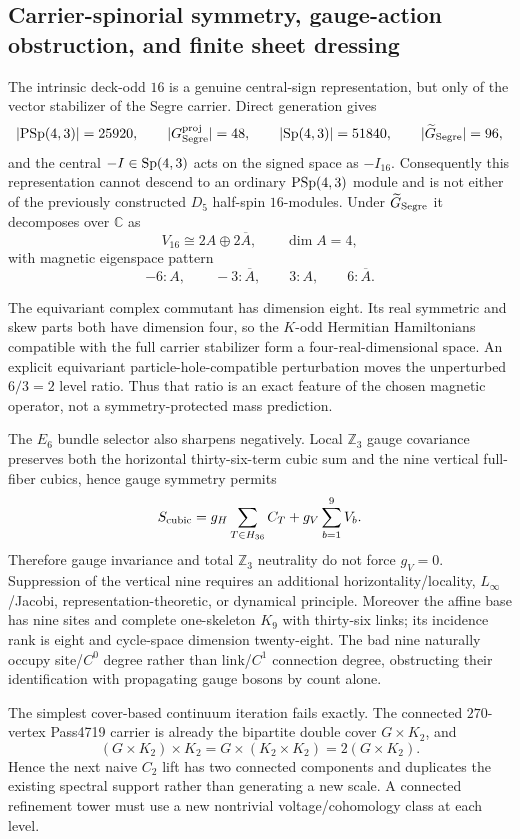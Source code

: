 \subsection{Carrier-spinorial symmetry, gauge-action obstruction, and finite sheet dressing}

The intrinsic deck-odd $16$ is a genuine central-sign representation, but only
of the vector stabilizer of the Segre carrier.  Direct generation gives
\[
 |\mathrm{PSp}(4,3)|=25920,\qquad |G_{\rm Segre}^{\rm proj}|=48,
 \qquad |\mathrm{Sp}(4,3)|=51840,\qquad |\widetilde G_{\rm Segre}|=96,
\]
and the central $-I\in\mathrm{Sp}(4,3)$ acts on the signed space as $-I_{16}$.
Consequently this representation cannot descend to an ordinary $\mathrm{PSp}(4,3)$
module and is not either of the previously constructed $D_5$ half-spin
$16$-modules.  Under $\widetilde G_{\rm Segre}$ it decomposes over $\mathbb C$ as
\[
 V_{16}\cong2A\oplus2\overline A,\qquad \dim A=4,
\]
with magnetic eigenspace pattern
\[
 -6:A,\qquad -3:\overline A,\qquad 3:A,\qquad 6:\overline A.
\]

The equivariant complex commutant has dimension eight.  Its real symmetric and
skew parts both have dimension four, so the $K$-odd Hermitian Hamiltonians
compatible with the full carrier stabilizer form a four-real-dimensional space.
An explicit equivariant particle-hole-compatible perturbation moves the
unperturbed $6/3=2$ level ratio.  Thus that ratio is an exact feature of the
chosen magnetic operator, not a symmetry-protected mass prediction.

The $E_6$ bundle selector also sharpens negatively.  Local $\mathbb Z_3$ gauge
covariance preserves both the horizontal thirty-six-term cubic sum and the nine
vertical full-fiber cubics, hence gauge symmetry permits
\[
 S_{\rm cubic}=g_H\sum_{T\in H_{36}}C_T+g_V\sum_{b=1}^{9}V_b.
\]
Therefore gauge invariance and total $\mathbb Z_3$ neutrality do not force
$g_V=0$.  Suppression of the vertical nine requires an additional
horizontality/locality, $L_\infty$/Jacobi, representation-theoretic, or dynamical
principle.  Moreover the affine base has nine sites and complete one-skeleton
$K_9$ with thirty-six links; its incidence rank is eight and cycle-space
dimension twenty-eight.  The bad nine naturally occupy site/$C^0$ degree rather
than link/$C^1$ connection degree, obstructing their identification with
propagating gauge bosons by count alone.

The simplest cover-based continuum iteration fails exactly.  The connected
$270$-vertex Pass4719 carrier is already the bipartite double cover
$G\times K_2$, and
\[
 (G\times K_2)\times K_2
 =G\times(K_2\times K_2)
 =2(G\times K_2).
\]
Hence the next naive $C_2$ lift has two connected components and duplicates the
existing spectral support rather than generating a new scale.  A connected
refinement tower must use a new nontrivial voltage/cohomology class at each
level.

